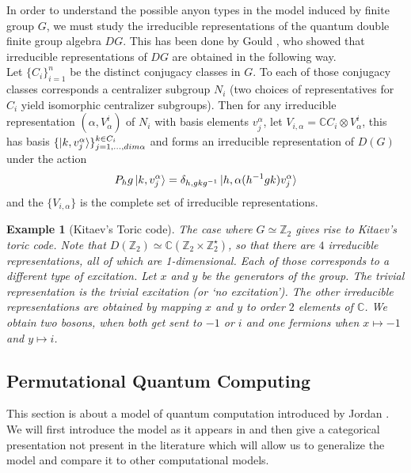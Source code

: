 \documentclass{article}
\newtheorem{example}{Example}
\begin{document}
In order to understand the possible anyon types in the model induced by finite group $G$, we must study the irreducible representations of the quantum double finite group algebra $DG$. This has been done by Gould \cite{Gould93}, who showed that irreducible representations of $DG$ are obtained in the following way.\\
Let $\{C_i\}_{i=1}^n$ be the distinct conjugacy classes in $G$. To each of those conjugacy classes corresponds a centralizer subgroup $N_i$ (two choices of representatives for $C_i$ yield isomorphic centralizer subgroups). Then for any irreducible representation $(\alpha,V^i_\alpha)$ of $N_i$ with basis elements $v^\alpha_j$, let $V_{i,\alpha} = \mathbb{C}C_i \otimes V^i_\alpha$, this has basis $\{ \ket{k,v^\alpha_j} \}_{j=1,...,dim\alpha}^{k\in C_i}$ and forms an irreducible representation of $D(G)$ under the action 
\begin{equation}
P_hg\ket{k,v^\alpha_j} = \delta_{h,gkg^{-1}} \ket{h,\alpha(h^{-1}gk)v^\alpha_j}
\end{equation}
and the $\{V_{i,\alpha}\}$ is the complete set of irreducible representations.

\begin{example}[Kitaev's Toric code]
	The case where $G \simeq \mathbb{Z}_2$ gives rise to Kitaev's toric code. Note that $D(\mathbb{Z}_2) \simeq \mathbb{C}(\mathbb{Z}_2\times \mathbb{Z}_2^\star)$, so that there are $4$ irreducible representations, all of which are 1-dimensional. Each of those corresponds to a different type of excitation.  Let $x$ and $y$ be the generators of the group. The trivial representation is the trivial excitation (or `no excitation'). The other irreducible representations are obtained by mapping $x$ and $y$ to order $2$  elements of $\mathbb{C}$. We obtain two bosons, when both get sent to $-1$ or $i$ and one fermions when $x \mapsto -1$ and $y \mapsto i$. 
\end{example}

\subsection{Permutational Quantum Computing}
This section is about a model of quantum computation introduced by Jordan \cite{Jordan09}. We will first introduce the model as it appears in \cite{Jordan09} and then give a categorical presentation not present in the literature which will allow us to generalize the model and compare it to other computational models.
\end{document}
